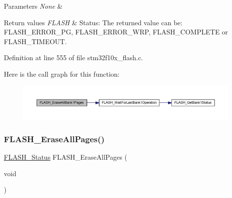 \begin{DoxyParams}{Parameters}
{\em None} & \\
\hline
\end{DoxyParams}

\begin{DoxyRetVals}{Return values}
{\em F\+L\+A\+SH} & Status\+: The returned value can be\+: F\+L\+A\+S\+H\+\_\+\+E\+R\+R\+O\+R\+\_\+\+PG, F\+L\+A\+S\+H\+\_\+\+E\+R\+R\+O\+R\+\_\+\+W\+RP, F\+L\+A\+S\+H\+\_\+\+C\+O\+M\+P\+L\+E\+TE or F\+L\+A\+S\+H\+\_\+\+T\+I\+M\+E\+O\+UT. \\
\hline
\end{DoxyRetVals}


Definition at line 555 of file stm32f10x\+\_\+flash.\+c.

Here is the call graph for this function\+:
\nopagebreak
\begin{figure}[H]
\begin{center}
\leavevmode
\includegraphics[width=350pt]{group___f_l_a_s_h___exported___functions_ga2036728450ee18e789b25fe3fd9c80ee_cgraph}
\end{center}
\end{figure}
\mbox{\label{group___f_l_a_s_h___exported___functions_gab2e6dea62c72b3e47c17512579d37498}} 
\subsubsection{\texorpdfstring{F\+L\+A\+S\+H\+\_\+\+Erase\+All\+Pages()}{FLASH\_EraseAllPages()}}
{\footnotesize\ttfamily \hyperlink{group___f_l_a_s_h___exported___types_gadc63a6f3404ff1f71229a66915e9cdc0}{F\+L\+A\+S\+H\+\_\+\+Status} F\+L\+A\+S\+H\+\_\+\+Erase\+All\+Pages (\begin{DoxyParamCaption}\item[{void}]{ }\end{DoxyParamCaption})}



